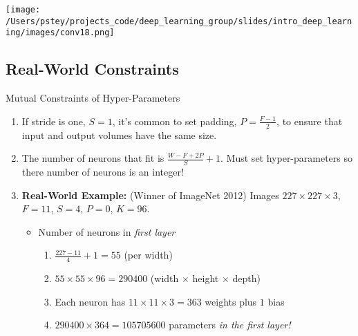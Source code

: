 \documentclass[pdf]{beamer}
\begin{document}
	\begin{frame}
	\begin{center}
		\texttt{[image: /Users/pstey/projects\_code/deep\_learning\_group/slides/intro\_deep\_learning/images/conv18.png]}
	\end{center}
	\end{frame}

\subsection{Real-World Constraints}
	\begin{frame}{Mutual Constraints of Hyper-Parameters}
	\begin{enumerate}
		\item If stride is one, $S = 1$, it's common to set padding, $P = \frac{F-1}{2}$, to ensure that input and output volumes have the same size. 
		\vspace{1em}
		\item The number of neurons that fit is $\frac{W - F + 2P}{S} + 1$. Must set hyper-parameters so there number of neurons is an integer!
		\vspace{1em}
		\item \textbf{Real-World Example:} (Winner of ImageNet 2012) Images $227 \times 227 \times 3$, $F = 11$, $S = 4$, $P = 0$, $K = 96$.
			\begin{itemize}
				\vspace{1em}
				\item Number of neurons in \textit{first layer}
				\begin{enumerate}[]
				
					\item $\frac{227 - 11}{4} + 1 = 55$ (per width) 
									\vspace{0.5em}
					\item $55 \times 55 \times 96 = 290400$ (width $\times$ height $\times$ depth)
									\vspace{0.5em}
					\item Each neuron has $11 \times 11 \times 3 = 363$ weights plus $1$ bias
									\vspace{0.5em}
					\item $290400 \times 364 = 105705600$ parameters \textit{in the first layer!}
				\end{enumerate}
			\end{itemize}
	
	\end{enumerate}
	\end{frame}
	
\end{document}
